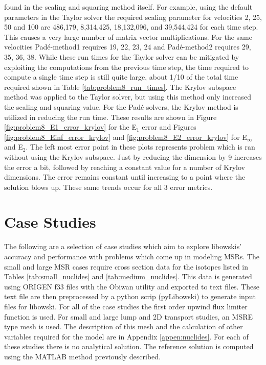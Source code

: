 \noindent found in the scaling and squaring method itself. For example, using the default parameters in the Taylor solver the required scaling parameter for velocities 2, 25, 50 and 100 are 486,179, 8,314,425, 18,132,096, and 39,544,424 for each time step. This causes a very large number of matrix vector multiplications. For the same velocities Pad\'e-method1 requires 19, 22, 23, 24 and Pad\'e-method2 requires 29, 35, 36, 38. While these run times for the Taylor solver can be mitigated by exploiting the computations from the previous time step, the time required to compute a single time step is still quite large, about 1/10 of the total time required shown in Table \ref{tab:problem8_run_times}. The Krylov subspace method was applied to the Taylor solver, but using this method only increased the scaling and squaring value. For the Pad\'e solvers, the Krylov method is utilized in reducing the run time. These results are shown in Figure \ref{fig:problem8_E1_error_krylov} for the E$_{1}$ error and Figures \ref{fig:problem8_Einf_error_krylov} and \ref{fig:problem8_E2_error_krylov} for E$_{\infty}$ and E$_{2}$. The left most error point in these plots represents problem which is ran without using the Krylov subspace. Just by reducing the dimension by 9 increases the error a bit, followed by reaching a constant value for a number of Krylov dimensions. The error remains constant until increasing to a point where the solution blows up. These same trends occur for all 3 error metrics. 

\section{Case Studies}
The following are a selection of case studies which aim to explore libowskis' accuracy and performance with problems which come up in modeling MSRs. The small and large MSR cases require cross section data for the isotopes listed in Tables \ref{tab:small_nuclides} and \ref{tab:medium_nuclides}. This data is generated using ORIGEN f33 files with the Obiwan utility and exported to text files. These text file are then preprocessed by a python scrip (pyLibowski) to generate input files for libowski. For all of the case studies the first order upwind flux limiter function is used. For small and large lump and 2D transport studies, an MSRE type mesh is used. The description of this mesh and the calculation of other variables required for the model are in Appendix \ref{appen:nuclides}. For each of these studies there is no analytical solution. The reference solution is computed using the MATLAB method previously described. 

